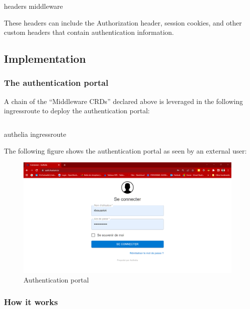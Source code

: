 \begin{listing}[H]
    \inputminted{Yaml}{codeListing/middleware_headers.yml}
    \caption{headers middleware}
    \label{lst:headers middleware}
\end{listing} 

These headers can include the Authorization header, session cookies, and other custom headers that contain authentication information. 

\subsection{Implementation }

\subsubsection{The authentication portal }

A chain of the “Middleware CRDs” declared above is leveraged in the following  ingressroute to deploy the authentication portal: 

\begin{listing}[H]
\inputminted{Yaml}{codeListing/authelia_ingressroute.yml}
\caption{authelia ingressroute}
\label{lst:authelia ingressroute}
\end{listing}

The following figure shows the authentication portal as seen by an external user: 
\begin{figure}[H]\centering
\includegraphics[width=1.0\textwidth,angle=00]{assets/f55.png}
\caption{Authentication portal}
\label{fig:f55}
\end{figure}

\subsubsection{How it works }

